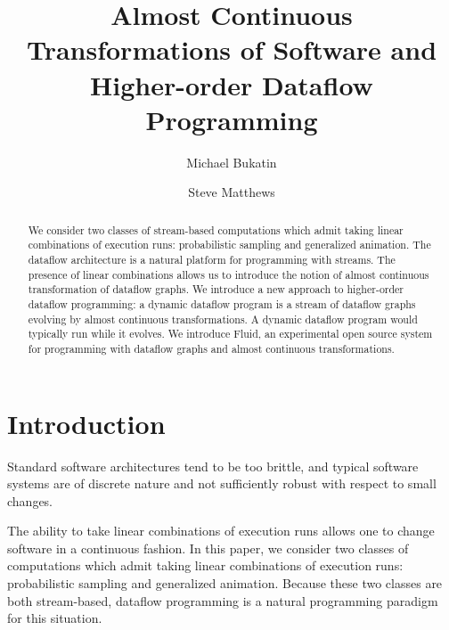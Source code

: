 \documentclass{llncs}
\begin{document}
\title{Almost Continuous Transformations of Software and Higher-order Dataflow Programming}

\author{Michael Bukatin\and Steve Matthews}



\maketitle

\begin{abstract}
We consider two classes of stream-based computations which admit taking linear combinations of execution runs:
probabilistic sampling and generalized animation. The dataflow architecture is a natural platform for programming
with streams. The presence of linear combinations allows us to introduce the notion of almost continuous transformation
of dataflow graphs. We introduce a new approach to higher-order dataflow programming: a dynamic
dataflow program is a stream of dataflow graphs evolving by almost continuous transformations.
A dynamic dataflow program would typically run while it evolves. We introduce
Fluid, an experimental open  source system for programming with dataflow graphs and almost continuous
transformations.


\end{abstract}



\section{Introduction}

Standard software architectures tend to be too brittle, and  typical software systems are of discrete nature and not sufficiently robust with respect to small changes.

The ability to take linear combinations of execution runs allows one to change software in a continuous fashion. In this paper, we consider two classes
of computations  which admit taking linear combinations of execution runs: probabilistic sampling and generalized animation. Because these two classes
are both stream-based, dataflow programming is a natural programming paradigm for this situation.
\end{document}
